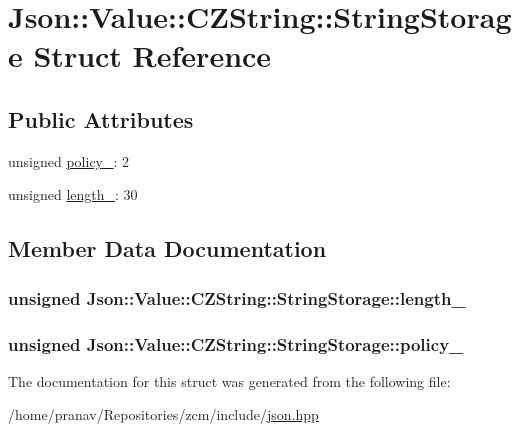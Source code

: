 \hypertarget{structJson_1_1Value_1_1CZString_1_1StringStorage}{}\section{Json\+:\+:Value\+:\+:C\+Z\+String\+:\+:String\+Storage Struct Reference}
\label{structJson_1_1Value_1_1CZString_1_1StringStorage}
\subsection*{Public Attributes}
\begin{DoxyCompactItemize}
\item 
unsigned \hyperlink{structJson_1_1Value_1_1CZString_1_1StringStorage_a7f68c8d6197c5692a525854b5f29f87b}{policy\+\_\+}\+: 2
\item 
unsigned \hyperlink{structJson_1_1Value_1_1CZString_1_1StringStorage_a165d865c44e6471d34668eeb4f15b140}{length\+\_\+}\+: 30
\end{DoxyCompactItemize}


\subsection{Member Data Documentation}
\subsubsection[{\texorpdfstring{length\+\_\+}{length_}}]{\setlength{\rightskip}{0pt plus 5cm}unsigned Json\+::\+Value\+::\+C\+Z\+String\+::\+String\+Storage\+::length\+\_\+}\hypertarget{structJson_1_1Value_1_1CZString_1_1StringStorage_a165d865c44e6471d34668eeb4f15b140}{}\label{structJson_1_1Value_1_1CZString_1_1StringStorage_a165d865c44e6471d34668eeb4f15b140}
\subsubsection[{\texorpdfstring{policy\+\_\+}{policy_}}]{\setlength{\rightskip}{0pt plus 5cm}unsigned Json\+::\+Value\+::\+C\+Z\+String\+::\+String\+Storage\+::policy\+\_\+}\hypertarget{structJson_1_1Value_1_1CZString_1_1StringStorage_a7f68c8d6197c5692a525854b5f29f87b}{}\label{structJson_1_1Value_1_1CZString_1_1StringStorage_a7f68c8d6197c5692a525854b5f29f87b}


The documentation for this struct was generated from the following file\+:\begin{DoxyCompactItemize}
\item 
/home/pranav/\+Repositories/zcm/include/\hyperlink{json_8hpp}{json.\+hpp}\end{DoxyCompactItemize}
